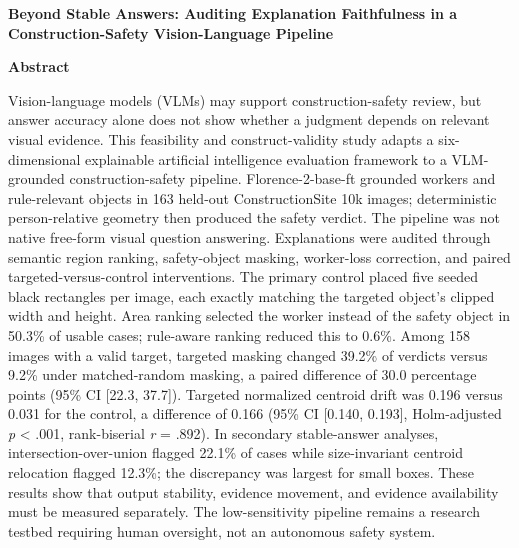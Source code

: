 \documentclass[12pt,letterpaper,twoside]{article}
\begin{document}
\begin{center}
\textbf{Beyond Stable Answers: Auditing Explanation Faithfulness in a Construction-Safety Vision-Language Pipeline}
\end{center}

\begin{center}
\textbf{Abstract}
\end{center}

Vision-language models (VLMs) may support construction-safety review, but answer accuracy alone does not show whether a judgment depends on relevant visual evidence. This feasibility and construct-validity study adapts a six-dimensional explainable artificial intelligence evaluation framework to a VLM-grounded construction-safety pipeline. Florence-2-base-ft grounded workers and rule-relevant objects in 163 held-out ConstructionSite 10k images; deterministic person-relative geometry then produced the safety verdict. The pipeline was not native free-form visual question answering. Explanations were audited through semantic region ranking, safety-object masking, worker-loss correction, and paired targeted-versus-control interventions. The primary control placed five seeded black rectangles per image, each exactly matching the targeted object's clipped width and height. Area ranking selected the worker instead of the safety object in 50.3\% of usable cases; rule-aware ranking reduced this to 0.6\%. Among 158 images with a valid target, targeted masking changed 39.2\% of verdicts versus 9.2\% under matched-random masking, a paired difference of 30.0 percentage points (95\% CI [22.3, 37.7]). Targeted normalized centroid drift was 0.196 versus 0.031 for the control, a difference of 0.166 (95\% CI [0.140, 0.193], Holm-adjusted \textit{p} < .001, rank-biserial \textit{r} = .892). In secondary stable-answer analyses, intersection-over-union flagged 22.1\% of cases while size-invariant centroid relocation flagged 12.3\%; the discrepancy was largest for small boxes. These results show that output stability, evidence movement, and evidence availability must be measured separately. The low-sensitivity pipeline remains a research testbed requiring human oversight, not an autonomous safety system.
\end{document}
